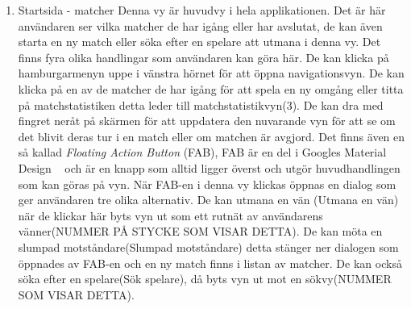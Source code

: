 \documentclass[a4paper, 11pt]{article}
\begin{document}
\begin{enumerate}
\pagebreak
\item \large \textup{Startsida - matcher}
Denna vy är huvudvy i hela applikationen. Det är här användaren ser vilka matcher de har igång eller har avslutat, de kan även starta en ny match eller söka efter en spelare att utmana i denna vy. Det finns fyra olika handlingar som användaren kan göra här. De kan klicka på hamburgarmenyn uppe i vänstra hörnet för att öppna navigationsvyn. De kan klicka på en av de matcher de har igång för att spela en ny omgång eller titta på matchstatistiken detta leder till matchstatistikvyn(3). De kan dra med fingret neråt på skärmen för att uppdatera den nuvarande vyn för att se om det blivit deras tur i en match eller om matchen är avgjord. Det finns även en så kallad \textit{Floating Action Button} (FAB), FAB är en del i Googles Material Design ~\cite{MaterialDesign} och är en knapp som alltid ligger överst och utgör huvudhandlingen som kan göras på vyn. När FAB-en i denna vy klickas öppnas en dialog som ger användaren tre olika alternativ. De kan utmana en vän (Utmana en vän) när de klickar här byts vyn ut som ett rutnät av användarens vänner(NUMMER PÅ STYCKE SOM VISAR DETTA). De kan möta en slumpad motståndare(Slumpad motståndare) detta stänger ner dialogen som öppnades av FAB-en och en ny match finns i listan av matcher. De kan också söka efter en spelare(Sök spelare), då byts vyn ut mot en sökvy(NUMMER SOM VISAR DETTA). 


\end{enumerate}
\end{document}
